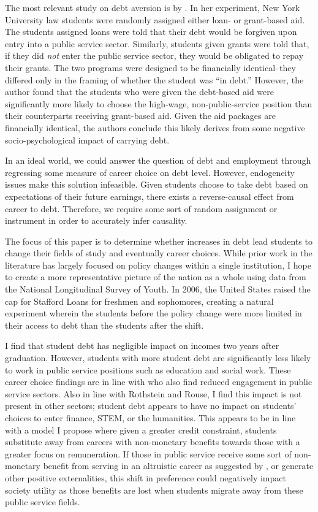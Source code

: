 \documentclass[12pt]{article}
\begin{document}
	The most relevant study on debt aversion is by \textcite{field2009}. In her experiment, New York University law students were randomly assigned either loan- or grant-based aid. The students assigned loans were told that their debt would be forgiven upon entry into a public service sector. Similarly, students given grants were told that, if they did \emph{not} enter the public service sector, they would be obligated to repay their grants. The two programs were designed to be financially identical--they differed only in the framing of whether the student was ``in debt.'' However, the author found that the students who were given the debt-based aid were significantly more likely to choose the high-wage, non-public-service position than their counterparts receiving grant-based aid. Given the aid packages are financially identical, the authors conclude this likely derives from some negative socio-psychological impact of carrying debt.
	
	In an ideal world, we could answer the question of debt and employment through regressing some measure of career choice on debt level. However, endogeneity issues make this solution infeasible. Given students choose to take debt based on expectations of their future earnings, there exists a reverse-causal effect from career to debt. Therefore, we require some sort of random assignment or instrument in order to accurately infer causality. 
	
	The focus of this paper is to determine whether increases in debt lead students to change their fields of study and eventually career choices. While prior work in the literature has largely focused on policy changes within a single institution, I hope to create a more representative picture of the nation as a whole using data from the National Longitudinal Survey of Youth. In 2006, the United States raised the cap for Stafford Loans for freshmen and sophomores, creating a natural experiment wherein the students before the policy change were more limited in their access to debt than the students after the shift.
	
	I find that student debt has negligible impact on incomes two years after graduation. However, students with more student debt are significantly less likely to work in public service positions such as education and social work. These career choice findings are in line with \textcite{rothstein2011} who also find reduced engagement in public service sectors. Also in line with Rothstein and Rouse, I find this impact is not present in other sectors; student debt appears to have no impact on students' choices to enter finance, STEM, or the humanities. This appears to be in line with a model I propose where given a greater credit constraint, students substitute away from careers with non-monetary benefits towards those with a greater focus on remuneration. If those in public service receive some sort of non-monetary benefit from serving in an altruistic career as suggested by \textcite{hanson1995}, or generate other positive externalities, this shift in preference could negatively impact society utility as those benefits are lost when students migrate away from these public service fields.
	
\end{document}

